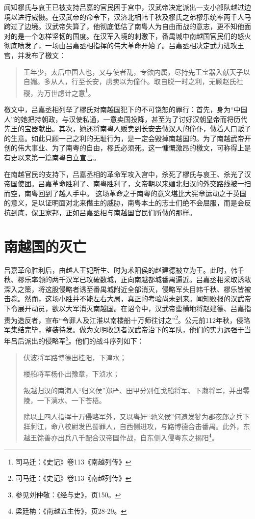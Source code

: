 闻知樛氏与哀王已被支持吕嘉的官民困于宫中，汉武帝决定派出一支小部队越过边境以进行威慑。在汉武帝的命令下，汉济北相韩千秋及樛氏之弟樛乐统率两千人马跨过了边境。汉武帝失算了，他彻底低估了南粤人为自由而战的意志，更不知他面对的是一个怎样坚韧的国度。在汉军入境的刺激下，番禺城中南越国官民们的怒火彻底喷发了，一场由吕嘉丞相指挥的伟大革命开始了。吕嘉丞相决定武力进攻王宫，并发布了檄文：

\begin{quote}
	王年少，太后中国人也，又与使者乱，专欲内属，尽持先王宝器入献天子以自媚。多从人，行至长安，虏卖以为僮仆。取自脱一时之利，无顾赵氏社稷，为万世虑计之意\footnote{司马迁：《史记》卷113《南越列传》}。
\end{quote}

檄文中，吕嘉丞相列举了樛氏对南越国犯下的不可饶恕的罪行：首先，身为“中国人”的她把持朝政，与汉使私通，一意卖国投降，甚至为了讨好汉朝皇帝而将历代先王的宝器献出。其次，她还将南粤人贩卖到长安去做汉人的僮仆，做着人口贩子的生意。如此只顾一己之利的无耻行为，是一定会毁掉南越国的。为了南越武帝开创的伟大事业、为了南粤的自由，樛氏必须死。这一慷慨激昂的檄文，可称得上是有史以来第一篇南粤自立宣言。

在南越官民的支持下，吕嘉丞相的革命军攻入宫中，杀死了樛氏与哀王、杀光了汉帝国使团。吕嘉革命胜利了、南粤胜利了，文帝朝以来媚北归汉的外交路线被一扫而空，南粤回到了越人手中。 这场革命之于南粤的意义堪比大宪章运动之于英国的意义，足以证明面对北来僭主的威胁，南粤本土的志士们绝不会屈服，而是会反抗到底，保卫家邦，正如吕嘉丞相与南越国官民们所做的那样。


\section{南越国的灭亡}

吕嘉革命胜利后，由越人王妃所生、时为术阳侯的赵建德被立为王。此时，韩千秋、樛乐率领的两千汉军已攻破数城，正向南越都城番禺逼近。吕嘉丞相采取诱敌深入之策，将这股侵略者诱至番禺城附近全部消灭，侵略军头目韩千秋、樛乐皆被击毙。然而，这场小胜并不能左右大局，真正的考验尚未到来。闻知败报的汉武帝下令展开动员，欲以大军消灭南越国。在诏令中，汉武帝蛮横地将赵建德、吕嘉指责为造反者，宣布“令罪人及江淮以南楼船十万师往讨之”\footnote{司马迁：《史记》卷113《南越列传》}。公元前112年秋，侵略军集结完毕，整装待发。做为文明收割者汉武帝治下的军队，他们的实力远强于当年吕后派出的侵略军\footnote{参见刘仲敬：《经与史》，页150。}。他们的战斗序列如下：

\begin{quote}
	伏波将军路博德出桂阳，下湟水；
	
	楼船将军杨仆出豫章，下浈水；
	
	叛越归汉的南海人“归义侯”郑严、田甲分别任戈船将军、下濑将军，并出零陵，一下漓水、一下苍梧。
	
	除以上四人指挥十万侵略军外，又以粤奸“驰义侯”何遗发犍为郡夜郎之兵下牂牁江，命八校尉发巴蜀罪人，自西侧进攻，与路博德合击番禺。此外，东越王馀善亦出兵八千配合汉帝国作战，自东侧入侵粤东之揭阳\footnote{梁廷柟：《南越五主传》，页28-29。}。
\end{quote}

